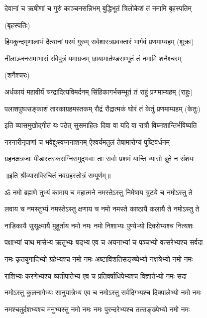 \twolineshloka
{देवानां च ऋषीणां च गुरुं काञ्चनसन्निभम्}
{बुद्धिभूतं त्रिलोकेशं तं नमामि बृहस्पतिम्}

\hfill (बृहस्पतिः)

\twolineshloka
{हिमकुन्दमृणालाभं दैत्यानां परमं गुरुम्}
{सर्वशास्त्रप्रवक्तारं भार्गवं प्रणमाम्यहम्}
\hfill (शुक्रः)

\twolineshloka
{नीलाञ्जनसमाभासं रविपुत्रं यमाग्रजम्}
{छायामार्तण्डसम्भूतं तं नमामि शनैश्चरम्}

\hfill (शनैश्चरः)

\twolineshloka
{अर्धकायं महावीर्यं चन्द्रादित्यविमर्दनम्}
{सिंहिकागर्भसम्भूतं तं राहुं प्रणमाम्यहम्}
\hfill (राहुः)

\twolineshloka
{पलाशपुष्पसङ्काशं तारकाग्रहमस्तकम्}
{रौद्रं रौद्रात्मकं घोरं तं केतुं प्रणमाम्यहम्}
\hfill (केतुः)

\twolineshloka
{इति व्यासमुखोद्गीतं यः पठेत् सुसमाहितः}
{दिवा वा यदि वा रात्रौ विघ्नशान्तिर्भविष्यति}

\twolineshloka
{नरनारीनृपाणां च भवेद्दुःस्वप्ननाशनम्}
{ऐश्वर्यमतुलं तेषामारोग्यं पुष्टिवर्धनम्}

\twolineshloka
{ग्रहनक्षत्रजाः पीडास्तस्कराग्निसमुद्भवाः}
{ताः सर्वाः प्रशमं यान्ति व्यासो ब्रूते न संशयः}

\centerline{॥इति श्रीव्यासविरचितं नवग्रहस्तोत्रं सम्पूर्णम्॥}


\twolineshloka
{ॐ नमो ब्रह्मणे तुभ्यं कामाय च महात्मने}
{नमस्तेऽस्तु निमेषाय त्रुटये च नमोऽस्तु ते}

\twolineshloka
{लवाय च नमस्तुभ्यं नमस्तेऽस्तु क्षणाय च}
{नमो नमस्ते काष्ठायै कलायै ते नमोऽस्तु ते}

\twolineshloka
{नाडिकायै सुसूक्ष्मायै मुहूर्ताय नमो नमः}
{नमो निशाभ्यः पुण्येभ्यो दिवसेभ्यश्च नित्यशः}

\twolineshloka
{पक्षाभ्यां चाथ मासेभ्य ऋतुभ्यः षड्भ्य एव च}
{अयनाभ्यां च पञ्चभ्यो वत्सरेभ्यश्च सर्वदा}

\twolineshloka
{नमः कृतयुगादिभ्यो ग्रहेभ्यश्च नमो नमः}
{अष्टाविंशतिसङ्ख्येभ्यो नक्षत्रेभ्यो नमो नमः}

\twolineshloka
{राशिभ्यः करणेभ्यश्च व्यतीपातेभ्य एव च}
{प्रतिवर्षाधिपेभ्यश्च विज्ञातेभ्यो नमः सदा}

\twolineshloka
{नमोऽस्तु कुलनागेभ्यः सानुयात्रेभ्य\footnotemark{} एव च}
{नमोऽस्तु सर्वदिग्भ्यश्च दिक्पालेभ्यो नमो नमः}

\twolineshloka
{नमश्चतुर्दशभ्यश्च मनुभ्यस्तु नमो नमः}
{नमः पुरन्दरेभ्यश्च तत्सङ्ख्येभ्यो नमो नमः}

